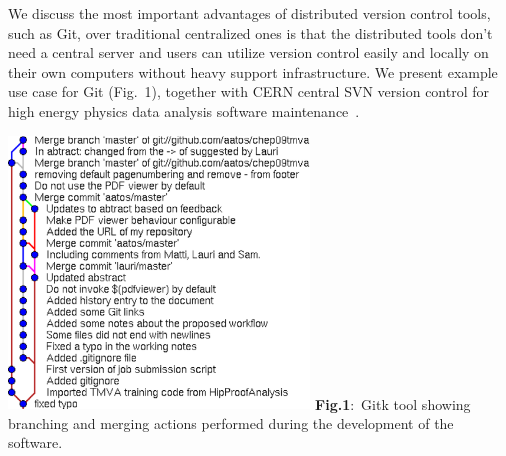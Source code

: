 \documentclass[12pt]{article}
\begin{document}

\begin{minipage}{6cm}
We discuss the most important advantages of distributed version control tools,
such as Git, over traditional centralized ones is that the distributed
tools don't need a central server and users can utilize
version control easily and locally on their own computers without
heavy support infrastructure.
We present example use case for Git (Fig.~1), 
together with CERN central SVN version control for high energy physics data
analysis software maintenance~\cite{pk09aProceedings}.


\end{minipage}
 \hfill
 \begin{minipage}{8cm}
\includegraphics[width=8cm]{gitk.eps} 
{\bf Fig.1}:~Gitk tool showing branching and merging actions
performed during the development of the software.
\end{minipage}

\end{document}
